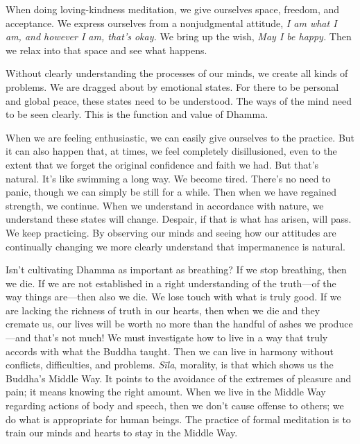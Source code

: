 When doing loving-kindness meditation, we give ourselves space, 
freedom, and acceptance. We express ourselves from a nonjudgmental 
attitude, \emph{I am what I am, and however I am, that's okay.} We 
bring up the wish, \emph{May I be happy.} Then we relax into that space 
and see what happens.


Without clearly understanding the processes of our minds, we create all 
kinds of problems. We are dragged about by emotional states. For there 
to be personal and global peace, these states need to be understood. 
The ways of the mind need to be seen clearly. This is the function and 
value of Dhamma.

When we are feeling enthusiastic, we can easily give ourselves to the 
practice. But it can also happen that, at times, we feel completely 
disillusioned, even to the extent that we forget the original 
confidence and faith we had. But that's natural. It's like swimming a 
long way. We become tired. There's no need to panic, though we can 
simply be still for a while. Then when we have regained strength, we 
continue. When we understand in accordance with nature, we understand 
these states will change. Despair, if that is what has arisen, will 
pass. We keep practicing. By observing our minds and seeing how our 
attitudes are continually changing we more clearly understand that 
impermanence is natural.

Isn't cultivating Dhamma as important as breathing? If we stop 
breathing, then we die. If we are not established in a right 
understanding of the truth---of the way things are---then also we die. 
We lose touch with what is truly good. If we are lacking the richness 
of truth in our hearts, then when we die and they cremate us, our lives 
will be worth no more than the handful of ashes we produce---and that's 
not much! We must investigate how to live in a way that truly accords 
with what the Buddha taught. Then we can live in harmony without 
conflicts, difficulties, and problems. \emph{Sīla}, morality, is that 
which shows us the Buddha's Middle Way. It points to the avoidance of 
the extremes of pleasure and pain; it means knowing the right amount. 
When we live in the Middle Way regarding actions of body and speech, 
then we don't cause offense to others; we do what is appropriate for 
human beings. The practice of formal meditation is to train our minds 
and hearts to stay in the Middle Way.

